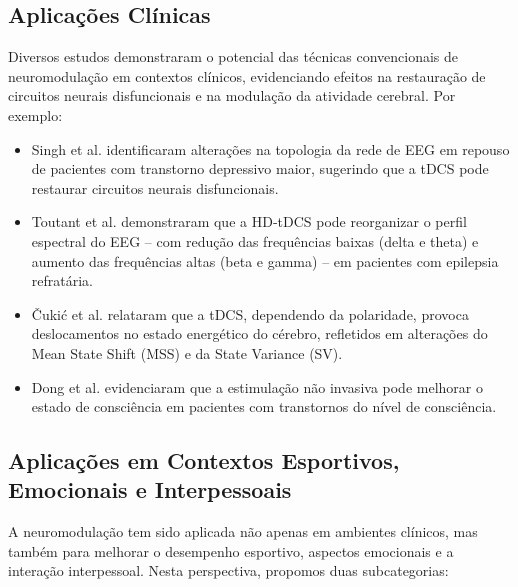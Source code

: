 \subsection{Aplicações Clínicas}
Diversos estudos demonstraram o potencial das técnicas convencionais de neuromodulação em contextos clínicos, evidenciando efeitos na restauração de circuitos neurais disfuncionais e na modulação da atividade cerebral. Por exemplo:
\begin{itemize}
    \item Singh et al. \cite{singh2024evaluating} identificaram alterações na topologia da rede de EEG em repouso de pacientes com transtorno depressivo maior, sugerindo que a tDCS pode restaurar circuitos neurais disfuncionais.
    \item Toutant et al. \cite{toutant2024hdtdcs} demonstraram que a HD‑tDCS pode reorganizar o perfil espectral do EEG – com redução das frequências baixas (delta e theta) e aumento das frequências altas (beta e gamma) – em pacientes com epilepsia refratária.
    \item Čukić et al. \cite{cukic2018shift} relataram que a tDCS, dependendo da polaridade, provoca deslocamentos no estado energético do cérebro, refletidos em alterações do Mean State Shift (MSS) e da State Variance (SV).
    \item Dong et al. \cite{dong2023efficacy} evidenciaram que a estimulação não invasiva pode melhorar o estado de consciência em pacientes com transtornos do nível de consciência.
\end{itemize}

\subsection{Aplicações em Contextos Esportivos, Emocionais e Interpessoais}
A neuromodulação tem sido aplicada não apenas em ambientes clínicos, mas também para melhorar o desempenho esportivo, aspectos emocionais e a interação interpessoal. Nesta perspectiva, propomos duas subcategorias:

